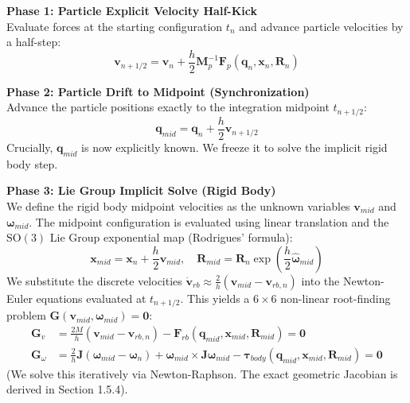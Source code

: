 \textbf{Phase 1: Particle Explicit Velocity Half-Kick}\\
Evaluate forces at the starting configuration $t_n$ and advance particle velocities by a half-step:
\begin{equation}
    \mathbf{v}_{n+1/2} = \mathbf{v}_n + \frac{h}{2} \mathbf{M}_p^{-1} \mathbf{F}_p(\mathbf{q}_n, \mathbf{x}_n, \mathbf{R}_n)
\end{equation}

\textbf{Phase 2: Particle Drift to Midpoint (Synchronization)}\\
Advance the particle positions exactly to the integration midpoint $t_{n+1/2}$:
\begin{equation}
    \mathbf{q}_{mid} = \mathbf{q}_n + \frac{h}{2} \mathbf{v}_{n+1/2}
\end{equation}
Crucially, $\mathbf{q}_{mid}$ is now explicitly known. We freeze it to solve the implicit rigid body step.

\textbf{Phase 3: Lie Group Implicit Solve (Rigid Body)}\\
We define the rigid body midpoint velocities as the unknown variables $\mathbf{v}_{mid}$ and $\boldsymbol{\omega}_{mid}$. The midpoint configuration is evaluated using linear translation and the $\text{SO}(3)$ Lie Group exponential map (Rodrigues' formula):
\begin{equation}
    \mathbf{x}_{mid} = \mathbf{x}_n + \frac{h}{2} \mathbf{v}_{mid}, \quad \mathbf{R}_{mid} = \mathbf{R}_n \exp\left( \frac{h}{2} \widehat{\boldsymbol{\omega}}_{mid} \right)
\end{equation}
We substitute the discrete velocities $\dot{\mathbf{v}}_{rb} \approx \frac{2}{h}(\mathbf{v}_{mid} - \mathbf{v}_{rb, n})$ into the Newton-Euler equations evaluated at $t_{n+1/2}$. This yields a $6 \times 6$ non-linear root-finding problem $\mathbf{G}(\mathbf{v}_{mid}, \boldsymbol{\omega}_{mid}) = \mathbf{0}$:
\begin{align}
    \mathbf{G}_v &= \frac{2M}{h} (\mathbf{v}_{mid} - \mathbf{v}_{rb, n}) - \mathbf{F}_{rb}(\mathbf{q}_{mid}, \mathbf{x}_{mid}, \mathbf{R}_{mid}) = \mathbf{0} \\
    \mathbf{G}_\omega &= \frac{2}{h} \mathbf{J} (\boldsymbol{\omega}_{mid} - \boldsymbol{\omega}_n) + \boldsymbol{\omega}_{mid} \times \mathbf{J} \boldsymbol{\omega}_{mid} - \boldsymbol{\tau}_{body}(\mathbf{q}_{mid}, \mathbf{x}_{mid}, \mathbf{R}_{mid}) = \mathbf{0}
\end{align}
(We solve this iteratively via Newton-Raphson. The exact geometric Jacobian is derived in Section 1.5.4).

